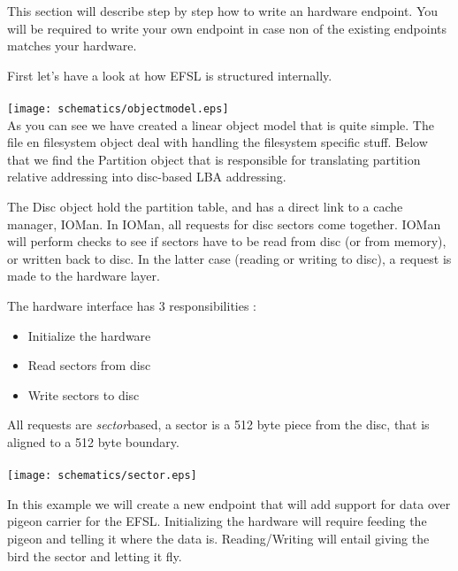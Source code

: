 \label{hwdriver}
This section will describe step by step how to write an hardware endpoint.
You will be required to write your own endpoint in case non of the existing endpoints
matches your hardware.

First let's have a look at how EFSL is structured internally.\\\\
\texttt{[image: schematics/objectmodel.eps]}\\

As you can see we have created a linear object model that is quite simple.
The file en filesystem object deal with handling the filesystem specific stuff.
Below that we find the Partition object that is responsible for translating partition
relative addressing into disc-based LBA addressing.

The Disc object hold the partition table, and has a direct link to a cache manager, IOMan.
In IOMan, all requests for disc sectors come together. IOMan will perform checks to see
if sectors have to be read from disc (or from memory), or written back to disc.
In the latter case (reading or writing to disc), a request is made to the hardware layer.

The hardware interface has 3 responsibilities :
\begin{itemize}
	\item Initialize the hardware
	\item Read sectors from disc
	\item Write sectors to disc
\end{itemize}

All requests are \textsl{sector}based, a sector is a 512 byte piece from the disc, that is aligned to
a 512 byte boundary.\\\\
\texttt{[image: schematics/sector.eps]}

In this example we will create a new endpoint that will add support for data over pigeon carrier
for the EFSL. Initializing the hardware will require feeding the pigeon and telling it where the
data is. Reading/Writing will entail giving the bird the sector and letting it fly.

